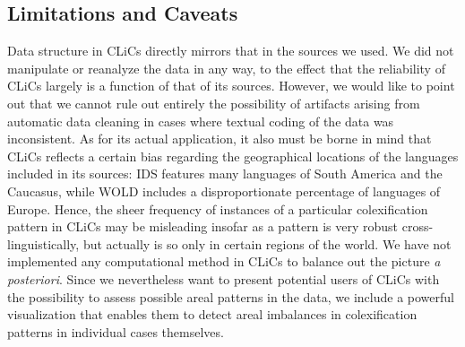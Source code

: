 \subsection{Limitations and Caveats} \label{caveats}

Data structure in CLiCs directly mirrors that in the sources we used. We did not manipulate or
reanalyze the data in any way, to the effect that the reliability of CLiCs largely is a function of
that of its sources. However, we would like to point out that we cannot rule out entirely the
possibility of artifacts arising from automatic data cleaning in cases where textual coding of the
data was inconsistent. As for its actual application, it also must be borne in mind that
CLiCs reflects a certain bias regarding the geographical locations of the languages included in its
sources: IDS features many languages of South America and the Caucasus, while WOLD includes a
disproportionate percentage of languages of Europe. Hence, the sheer frequency of instances of a particular colexification pattern in CLiCs may be misleading insofar as a pattern is very robust
cross-linguistically, but actually is so only in certain regions of the world. We have not
implemented any computational method in CLiCs to balance out the picture \emph{a posteriori}. Since we
nevertheless want to present potential users of CLiCs with the possibility to assess possible areal
patterns in the data, we include a powerful visualization that enables them to detect areal
imbalances in colexification patterns in individual cases themselves.


